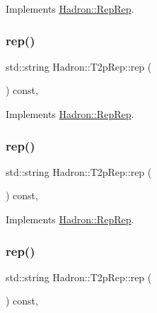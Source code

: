 Implements \mbox{\hyperlink{structHadron_1_1RepRep_ab3213025f6de249f7095892109575fde}{Hadron\+::\+Rep\+Rep}}.

\mbox{\label{structHadron_1_1T2pRep_abf712164cb437c03107c2467574b32c1}} 
\subsubsection{\texorpdfstring{rep()}{rep()}\hspace{0.1cm}{\footnotesize\ttfamily [3/5]}}
{\footnotesize\ttfamily std\+::string Hadron\+::\+T2p\+Rep\+::rep (\begin{DoxyParamCaption}{ }\end{DoxyParamCaption}) const\hspace{0.3cm}{\ttfamily [inline]}, {\ttfamily [virtual]}}



Implements \mbox{\hyperlink{structHadron_1_1RepRep_ab3213025f6de249f7095892109575fde}{Hadron\+::\+Rep\+Rep}}.

\mbox{\label{structHadron_1_1T2pRep_abf712164cb437c03107c2467574b32c1}} 
\subsubsection{\texorpdfstring{rep()}{rep()}\hspace{0.1cm}{\footnotesize\ttfamily [4/5]}}
{\footnotesize\ttfamily std\+::string Hadron\+::\+T2p\+Rep\+::rep (\begin{DoxyParamCaption}{ }\end{DoxyParamCaption}) const\hspace{0.3cm}{\ttfamily [inline]}, {\ttfamily [virtual]}}



Implements \mbox{\hyperlink{structHadron_1_1RepRep_ab3213025f6de249f7095892109575fde}{Hadron\+::\+Rep\+Rep}}.

\mbox{\label{structHadron_1_1T2pRep_abf712164cb437c03107c2467574b32c1}} 
\subsubsection{\texorpdfstring{rep()}{rep()}\hspace{0.1cm}{\footnotesize\ttfamily [5/5]}}
{\footnotesize\ttfamily std\+::string Hadron\+::\+T2p\+Rep\+::rep (\begin{DoxyParamCaption}{ }\end{DoxyParamCaption}) const\hspace{0.3cm}{\ttfamily [inline]}, {\ttfamily [virtual]}}




